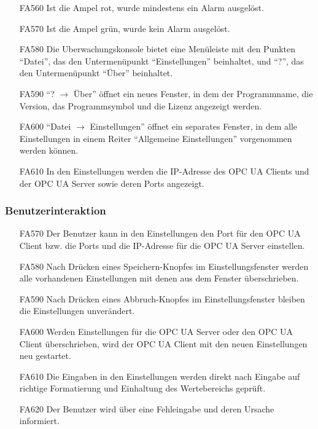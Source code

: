 \documentclass[parskip=full]{scrartcl}
\begin{document}
\begin{enumerate}
\item[FA560] Ist die Ampel rot, wurde mindestens ein Alarm ausgelöst.
\item[FA570] Ist die Ampel grün, wurde kein Alarm ausgelöst.
\item[FA580] Die \gls{Uberwachungskonsole} bietet eine Menüleiste mit den Punkten "`Datei"', das den Untermenüpunkt "`Einstellungen"' beinhaltet, und "`?"', das den Untermenüpunkt "`Über"' beinhaltet.
\item[FA590] "`? $\rightarrow$ Über"' öffnet ein neues Fenster, in dem der Programmname, die Version, das Programmsymbol und die Lizenz angezeigt werden.
\item[FA600] "`Datei $\rightarrow$ Einstellungen"' öffnet ein separates Fenster, in dem alle Einstellungen in einem Reiter "`Allgemeine Einstellungen"' vorgenommen werden können.
\item[FA610] In den Einstellungen werden die IP-Adresse des \gls{OPC UA} Clients und der \gls{OPC UA} Server sowie deren Ports angezeigt.
\end{enumerate}

\subsubsection{Benutzerinteraktion}
\begin{enumerate}
\item[FA570] Der Benutzer kann in den Einstellungen den Port für den \gls{OPC UA} Client bzw. die Ports und die IP-Adresse für die \gls{OPC UA} Server einstellen.
\item[FA580] Nach Drücken eines Speichern-Knopfes im Einstellungsfenster werden alle vorhandenen Einstellungen mit denen aus dem Fenster überschrieben.
\item[FA590] Nach Drücken eines Abbruch-Knopfes im Einstellungsfenster bleiben die Einstellungen unverändert.
\item[FA600] Werden Einstellungen für die \gls{OPC UA} Server oder den \gls{OPC UA} Client überschrieben, wird der \gls{OPC UA} Client mit den neuen Einstellungen neu gestartet.
\item[FA610] Die Eingaben in den Einstellungen werden direkt nach Eingabe auf richtige Formatierung und Einhaltung des Wertebereichs gepr\"uft.
\item[FA620] Der Benutzer wird über eine Fehleingabe und deren Ursache informiert.
\end{enumerate}
\end{document}
